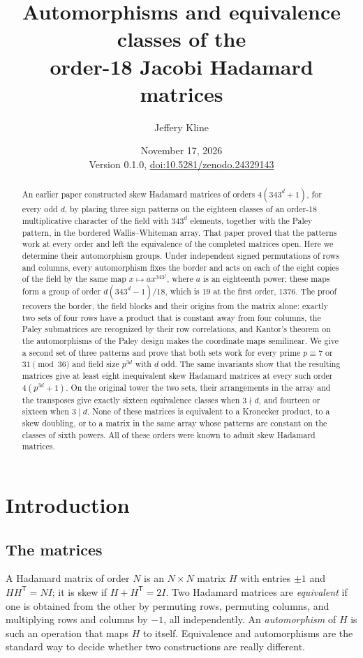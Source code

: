 \documentclass[11pt]{article}
\title{Automorphisms and equivalence classes of the\\ order-18 Jacobi Hadamard matrices}
\author{Jeffery Kline}
\date{November 17, 2026\\[3pt]\small Version 0.1.0, \href{https://doi.org/10.5281/zenodo.24329143}{doi:10.5281/zenodo.24329143}}
\theoremstyle{plain}
\theoremstyle{definition}
\theoremstyle{remark}
\begin{document}
\maketitle

\begin{abstract}
An earlier paper constructed skew Hadamard matrices of orders
$4(343^d+1)$, for every odd $d$, by placing three sign patterns on the
eighteen classes of an order-18 multiplicative character of the field with
$343^d$ elements, together with the Paley pattern, in the bordered
Wallis--Whiteman array. That paper proved that the patterns work at every
order and left the equivalence of the completed matrices open. Here we
determine their automorphism groups. Under independent signed permutations
of rows and columns, every automorphism fixes the border and acts on each of
the eight copies of the field by the same map $x\mapsto ax^{343^j}$, where
$a$ is an eighteenth power; these maps form a group of order $d(343^d-1)/18$, which is
$19$ at the first order, $1376$. The proof recovers the border, the field
blocks and their origins from the matrix alone: exactly two sets of four rows
have a product that is constant away from four columns, the Paley
submatrices are recognized by their row correlations, and Kantor's theorem
on the automorphisms of the Paley design makes the coordinate maps
semilinear. We give a second set of three patterns and prove that both sets
work for every prime $p\equiv7$ or $31\pmod{36}$ and field size $p^{3d}$ with $d$ odd.
The same invariants show that the resulting matrices give at least eight
inequivalent skew Hadamard matrices at every such order $4(p^{3d}+1)$. On the
original tower the two sets, their arrangements in the array and the
transposes give exactly sixteen equivalence classes when $3\nmid d$, and
fourteen or sixteen when $3\mid d$. None of these matrices is equivalent to
a Kronecker product, to a skew doubling, or to a matrix in the same array
whose patterns are constant on the classes of sixth powers. All of these
orders were known to admit skew Hadamard matrices.
\end{abstract}

\section{Introduction}\label{sec:intro}

\subsection{The matrices}
A Hadamard matrix of order $N$ is an $N\times N$ matrix $H$ with entries
$\pm1$ and $HH^{\mathsf T}=NI$; it is skew if $H+H^{\mathsf T}=2I$. Two
Hadamard matrices are \emph{equivalent} if one is obtained from the other by
permuting rows, permuting columns, and multiplying rows and columns by $-1$,
all independently. An \emph{automorphism} of $H$ is such an operation that
maps $H$ to itself. Equivalence and automorphisms are the standard way to
decide whether two constructions are really different.
\end{document}
